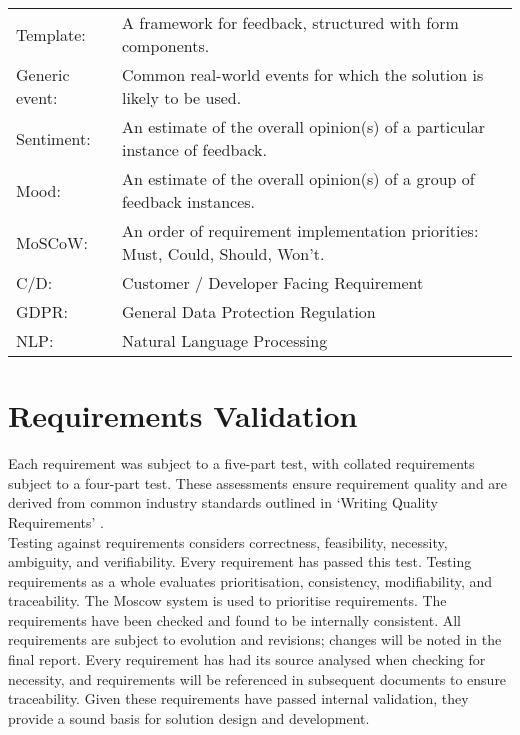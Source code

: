 \documentclass[9pt, titlepage]{extarticle}
\begin{document}
\begin{tabularx}{\linewidth}{ l X }
    
    {Template:}         & A framework for feedback, structured with form components.\\
    {Generic event:}    & Common real-world events for which the solution is likely to be used.\\
    {Sentiment:}        & An estimate of the overall opinion(s) of a particular instance of feedback.\\
    {Mood:}             & An estimate of the overall opinion(s) of a group of feedback instances.\\
    {MoSCoW:}       & An order of requirement implementation priorities: Must, Could, Should, Won’t.\\
    {C/D:}          & Customer / Developer Facing Requirement\\
    {GDPR:}         & General Data Protection Regulation\\
    {NLP:}          & Natural Language Processing\\
\end{tabularx}

\section{Requirements Validation}

Each requirement was subject to a five-part test, with collated requirements subject to a four-part test. 
These assessments ensure requirement quality and are derived from common industry standards outlined in `Writing Quality Requirements' \autocite{reqs}.\\ 

Testing against requirements considers correctness, feasibility, necessity, ambiguity, and verifiability. 
Every requirement has passed this test. 
Testing requirements as a whole evaluates prioritisation, consistency, modifiability, and traceability. The Moscow system is used to prioritise requirements.
The requirements have been checked and found to be internally consistent. 
All requirements are subject to evolution and revisions; changes will be noted in the final report. 
Every requirement has had its source analysed when checking for necessity, and requirements will be referenced in subsequent documents to ensure traceability. 
Given these requirements have passed internal validation, they provide a sound basis for solution design and development.
\end{document}
